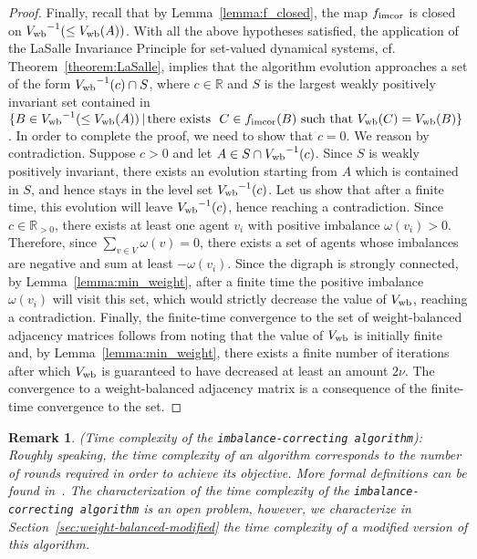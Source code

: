 \documentclass[final]{siamltex}
\newtheorem{remark}[theorem]{Remark}
\begin{document}
\begin{proof}
  Finally, recall that by Lemma~\ref{lemma:f_closed}, the map $
  {{f}_{\textup{{imcor}}}} $ is closed on $ {{V}_{\textup{{wb}}}}^{-1}(\le
  {{V}_{\textup{{wb}}}}(A))$.  With all the above hypotheses satisfied, the
  application of the LaSalle Invariance Principle for set-valued
  dynamical systems, cf. Theorem~\ref{theorem:LaSalle}, implies that
  the algorithm evolution approaches a set of the form $
  {{V}_{\textup{{wb}}}}^{-1}(c)\cap S $, where $ c \in \mathbb{R} $ and $ S $
  is the largest weakly positively invariant set contained in $ \{B\in
  {{V}_{\textup{{wb}}}}^{-1}(\le {{V}_{\textup{{wb}}}}(A)) \, | \, \text{there
    exists } \ C\in {{f}_{\textup{{imcor}}}}(B) \text{ such that }
  {{V}_{\textup{{wb}}}}(C)={{V}_{\textup{{wb}}}}(B)\}$. In order to complete the
  proof, we need to show that $ c=0 $. We reason by
  contradiction. Suppose $ c>0$ and let $ A \in S \cap
  {{V}_{\textup{{wb}}}}^{-1}(c) $. Since $S$ is weakly positively invariant,
  there exists an evolution starting from $A$ which is contained in $
  S $, and hence stays in the level set $ {{V}_{\textup{{wb}}}}^{-1}(c) $.
  Let us show that after a finite time, this evolution will leave
  ${{V}_{\textup{{wb}}}}^{-1}(c) $, hence reaching a contradiction.  Since $
  c \in \mathbb{R}_{>0} $, there exists at least one agent $ v_i $
  with positive imbalance $ \omega(v_i)>0 $. Therefore, since $
  \sum_{v\in V}\omega(v)=0 $, there exists a set of agents whose
  imbalances are negative and sum at least $ -\omega(v_i) $.  Since
  the digraph is strongly connected, by Lemma~\ref{lemma:min_weight},
  after a finite time the positive imbalance $ \omega(v_i) $ will
  visit this set, which would strictly decrease the value of
  ${{V}_{\textup{{wb}}}}$, reaching a contradiction.  Finally, the
  finite-time convergence to the set of weight-balanced adjacency
  matrices follows from noting that the value of ${{V}_{\textup{{wb}}}}$ is
  initially finite and, by Lemma~\ref{lemma:min_weight}, there exists
  a finite number of iterations after which ${{V}_{\textup{{wb}}}}$ is
  guaranteed to have decreased at least an amount $2 \nu$.  The
  convergence to a weight-balanced adjacency matrix is a consequence
  of the finite-time convergence to the set.
\end{proof}

\begin{remark}{\mbox{}\textup{({Time complexity of the {\texttt{imbalance-correcting algorithm}\xspace}}):}}
  {\rm Roughly speaking, the time complexity of an algorithm
    corresponds to the number of rounds required in order to achieve
    its objective. More formal definitions can be found
    in~\cite{FB-JC-SM:08cor,NAL:97,DP:00, GT:01}.  The
    characterization of the time complexity of the {\texttt{imbalance-correcting algorithm}\xspace} is an open
    problem, however, we characterize in
    Section~\ref{sec:weight-balanced-modified} the time complexity of
    a modified version of this algorithm.  {\relax\ifmmode\else\unskip\hfill\fi{\hbox{$\bullet$}}} }
  
  
  
\end{remark}
\end{document}
